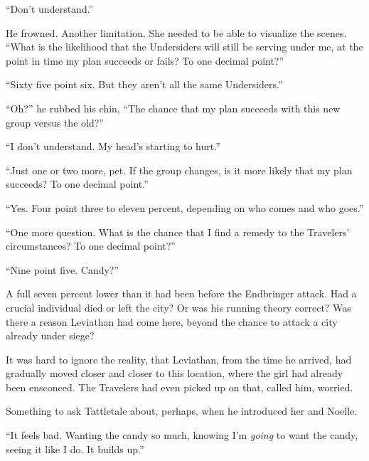 ``Don't understand.''



He frowned.  Another limitation.  She needed to be able to visualize the scenes.  ``What is the likelihood that the Undersiders will still be serving under me, at the point in time my plan succeeds or fails?  To one decimal point?''



``Sixty five point six.  But they aren't all the same Undersiders.''



``Oh?'' he rubbed his chin, ``The chance that my plan succeeds with this new group versus the old?''



``I don't understand.  My head's starting to hurt.''



``Just one or two more, pet.  If the group changes, is it more likely that my plan succeeds?  To one decimal point.''



``Yes.  Four point three to eleven percent, depending on who comes and who goes.''



``One more question.  What is the chance that I find a remedy to the Travelers' circumstances?  To one decimal point?''



``Nine point five.  Candy?''



A full seven percent lower than it had been before the Endbringer attack.  Had a crucial individual died or left the city?  Or was his running theory correct?  Was there a reason Leviathan had come here, beyond the chance to attack a city already under siege?



It was hard to ignore the reality, that Leviathan, from the time he arrived, had gradually moved closer and closer to this location, where the girl had already been ensconced.  The Travelers had even picked up on that, called him, worried.



Something to ask Tattletale about, perhaps, when he introduced her and Noelle.



``It feels bad.  Wanting the candy so much, knowing I'm \emph{going} to want the candy, seeing it like I do.  It builds up.''



